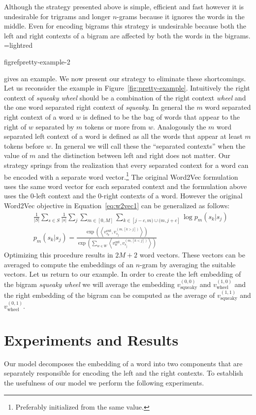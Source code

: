 \documentclass{article}
\makeatletter
\newcommand{\mybox}[2][lightred]{%
  \setbox0=\hbox{#1}%
  \setlength{\@tempdima}{\dimexpr\wd0+13pt}%
  \begin{tcolorbox}[%
    hbox,%
    halign=justify,
    nobeforeafter,%
    colframe=black,%
    colback=#1,%
    boxrule=.5pt,%
    arc=5pt,%
    left=4pt,right=0pt,top=0pt,bottom=0pt,%
    boxsep=2pt]%
    #2
  \end{tcolorbox}
}
\newcommand{\figref}[1]{Figure~\ref{#1}}
\renewcommand{\eqref}[1]{Equation~\ref{#1}}
\newcommand{\vo}[1]{v^{\textrm{out}}_{#1}}
\newcommand{\ip}[2]{\left\langle#1, #2\right\rangle}
\newcommand{\wv}{Word2Vec\xspace}
\makeatother
\begin{document}
Although the strategy presented above is simple, efficient and fast however it
is undesirable for trigrams and longer $n$-grams because it ignores the words in
the middle. Even for encoding bigrams this strategy is undesirable because
both the left and right contexts of a bigram are affected by both the words in the
bigrams. \mybox{figref{pretty-example-2}} gives an example.
We now present our strategy to eliminate these shortcomings. Let us reconsider
the example in \figref{fig:pretty-example}. Intuitively the right context of
\textit{squeaky wheel} should be a combination of the right context
\textit{wheel} and the one word separated right context of \textit{squeaky}.
In general the $m$ word separated right context of a word $w$ is defined to be
the bag of words that appear to the right of $w$ separated by $m$ tokens or more
from $w$. Analogously the $m$ word separated left context of a word is defined
as all the words that appear at least $m$ tokens before $w$. In general we will
call these the ``{separated contexts}'' when the value of $m$ and the
distinction between left and right does not matter. Our strategy
springs from the realization that every separated context for a word can be
encoded with a separate word vector.\footnote{Preferably initialized from the
  same value.} The original \wv formulation uses the same word vector for each
separated context and the formulation above uses the $0$-left context and the
$0$-right contexts of a word. However the original \wv objective in
\eqref{eq:w2vec1} can be generalized as follows:
\begin{align}\label{eq:general}
  &\frac{1}{|S|} \sum_{s \in S} \frac{1}{|s|} \sum_{j} \sum_{m \in [0, M]} \sum_{k \in [j-c,m) \cup (m,j+c]} \log p_m(s_k | s_j)\\
  &p_m(s_k | s_j) = \frac{\exp\left(\ip{\vo{s_k}}{v_{s_j}^{(m,[k>j])}}\right)}{\exp\left(\sum_{w \in W}\ip{\vo{w}}{v_{s_j}^{(m,[k<j])}}\right)}
\end{align}
Optimizing this procedure results in $2M+2$ word vectors. These vectors can be
averaged to compute the embeddings of an $n$-gram by averaging the suitable
vectors. Let us return to our example. In order to create the left embedding of the
bigram \textit{squeaky wheel} we will average the embedding
$v_{\textrm{squeaky}}^{(0,0)}$ and $v_{\textrm{wheel}}^{(1,0)}$ and the right embedding of the
bigram can be computed as the average of
$v_{\textrm{squeaky}}^{(1,1)}$ and $v_{\textrm{wheel}}^{(0,1)}$.

\section{Experiments and Results}
\label{sec:experiments-results}
Our model decomposes the embedding of a word into two components that are
separately responsible for encoding the left and the right contexts. To
establish the usefulness of our model we perform the following experiments.
\end{document}
